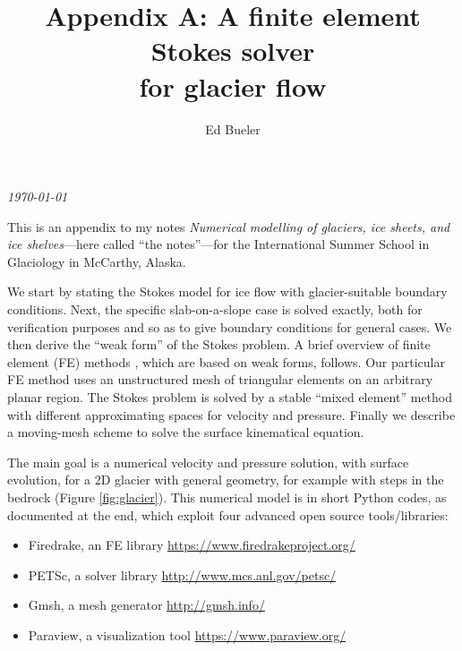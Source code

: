 \documentclass[letterpaper,final,12pt,reqno]{amsart}
\begin{document}
\graphicspath{{figures/}}

\title[Appendix A]{Appendix A: A finite element Stokes solver \\ for glacier flow}

\author{Ed Bueler}

\maketitle

\vspace{-8mm}
\begin{center}
\footnotesize
\emph{\today}
\end{center}

\thispagestyle{empty}
\bigskip

\renewcommand{\thefigure}{A\arabic{figure}}
\renewcommand{\theequation}{A\arabic{equation}}
\renewcommand{\thesection}{A.\arabic{section}}

This is an appendix to my notes \emph{Numerical modelling of glaciers, ice sheets, and ice shelves}---here called ``the notes''---for the International Summer School in Glaciology in McCarthy, Alaska.

We start by stating the Stokes model for ice flow with glacier-suitable boundary conditions.  Next, the specific slab-on-a-slope case is solved exactly, both for verification purposes and so as to give boundary conditions for general cases.  We then derive the ``weak form'' of the Stokes problem.  A brief overview of finite element (FE) methods \cite{Elmanetal2014}, which are based on weak forms, follows.  Our particular FE method uses an unstructured mesh of triangular elements on an arbitrary planar region.  The Stokes problem is solved by a stable ``mixed element'' method with different approximating spaces for velocity and pressure.  Finally we describe a moving-mesh scheme to solve the surface kinematical equation.

The main goal is a numerical velocity and pressure solution, with surface evolution, for a 2D glacier with general geometry, for example with steps in the bedrock (Figure \ref{fig:glacier}).  This numerical model is in short Python codes, as documented at the end, which exploit four advanced open source tools/libraries:
\begin{itemize}
\item Firedrake, an FE library \hfill \url{https://www.firedrakeproject.org/}
\item PETSc, a solver library \hfill \url{http://www.mcs.anl.gov/petsc/}
\item Gmsh, a mesh generator \hfill \url{http://gmsh.info/}
\item Paraview, a visualization tool \hfill \url{https://www.paraview.org/}
\end{itemize}
\end{document}
